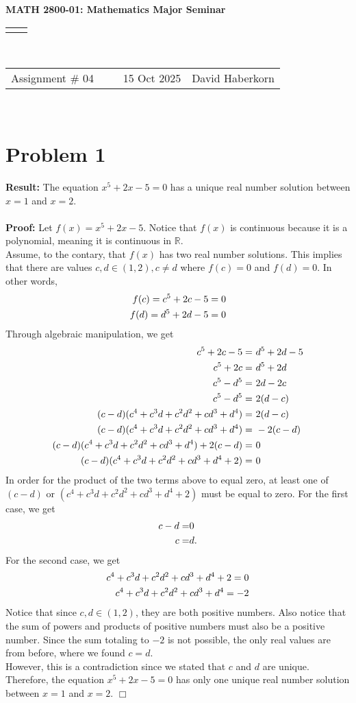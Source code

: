 \documentclass[11pt]{article}
\renewcommand{\title}[1]{\textbf{#1}\\}
\renewcommand{\line}{\begin{tabularx}{\textwidth}{X>{\raggedleft}X}\hline\\\end{tabularx}\\[-0.5cm]}
\newcommand{\leftright}[2]{\begin{tabularx}{\textwidth}{X>{\raggedleft}X}#1%
& #2\\\end{tabularx}\\[-0.5cm]}
\begin{document}
\title{MATH 2800-01: Mathematics Major Seminar}
\line
\leftright{Assignment \# 04 ~~~~ 15 Oct 2025}{David Haberkorn}


\section*{Problem 1}

    \textbf{Result:} The equation $x^5 + 2x - 5 = 0$ has a unique real number solution between $x=1$ and $x=2$.\\
    \\
    \textbf{Proof:} Let $f(x) = x^5 + 2x - 5$. Notice that $f(x)$ is continuous because it is a polynomial, meaning it is continuous in $\mathbb{R}$. \\
    Assume, to the contary, that $f(x)$ has two real number solutions. This implies that there are values $c,d \in (1,2), c \neq d$ where $f(c) = 0$ and $f(d) = 0$. In other words,
    \begin{align}
        f(c) = c^5 + 2c - 5 = 0 \notag \\
        f(d) = d^5 + 2d - 5 = 0 \notag
    \end{align}
    Through algebraic manipulation, we get
    \begin{align}
        c^5 + 2c - 5 =& \ d^5 + 2d - 5 \notag \\
        c^5 + 2c =& \ d^5 + 2d \notag \\
        c^5 - d^5 =& \ 2d - 2c \notag \\
        c^5 - d^5 =& \ 2(d-c) \notag \\
        (c - d)(c^4 + c^3d + c^2d^2 + cd^3 + d^4) =& \ 2(d-c) \notag \\
        (c - d)(c^4 + c^3d + c^2d^2 + cd^3 + d^4) =& \ -2(c-d) \notag \\
        (c - d)(c^4 + c^3d + c^2d^2 + cd^3 + d^4) + 2(c-d)=& \ 0 \notag \\
        (c - d)(c^4 + c^3d + c^2d^2 + cd^3 + d^4 + 2) =& \ 0 \notag
    \end{align}
    In order for the product of the two terms above to equal zero, at least one of $(c-d)$ or $(c^4 + c^3d + c^2d^2 + cd^3 + d^4 + 2)$ must be equal to zero. For the first case, we get
    \begin{align}
        c-d =& 0 \notag \\
        c =& d . \notag
    \end{align}
    For the second case, we get
    \begin{align}
        c^4 + c^3d + c^2d^2 + cd^3 + d^4 + 2 = 0 \notag \\
        c^4 + c^3d + c^2d^2 + cd^3 + d^4 = -2 \notag
    \end{align}
    Notice that since $c,d \in (1,2)$, they are both positive numbers. Also notice that the sum of powers and products of positive numbers must also be a positive number. Since the sum totaling to $-2$ is not possible, the only real values are from before, where we found $c=d$.\\
    However, this is a contradiction since we stated that $c$ and $d$ are unique. Therefore, the equation $x^5 + 2x - 5 = 0$ has only one unique real number solution between $x=1$ and $x=2$. \hfill $\Box$
\newpage
\end{document}

